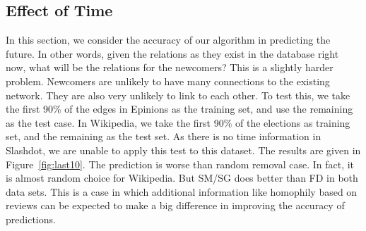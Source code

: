 \documentclass[acmtweb]{acmsmall}
\begin{document}
\begin{figure}[thbp!]
\end{figure}


\subsection{Effect of Time} \label{sec:results-time}
In this section, we consider the accuracy of our algorithm in
predicting the future. In other words, given the relations as they
exist in the database right now, what will be the relations for the
newcomers? This is a slightly harder problem. Newcomers are unlikely
to have many connections to the existing network. They are also
very unlikely to link to each other. To test this, we take the first
90\% of the edges in Epinions as the training set, and use the
remaining as the test case. In Wikipedia, we take the first 90\% of
the elections as training set, and the remaining as the test set. As
there is no time information in Slashdot, we are unable to apply this
test to this dataset. The results are given in
Figure~\ref{fig:last10}. The prediction is worse than random removal
case. In fact, it is almost random choice for Wikipedia. But SM/SG
does better than FD in both data sets. This is a case in which
additional information like homophily based on reviews can be expected
to make a big difference in improving the accuracy of predictions.
\end{document}
